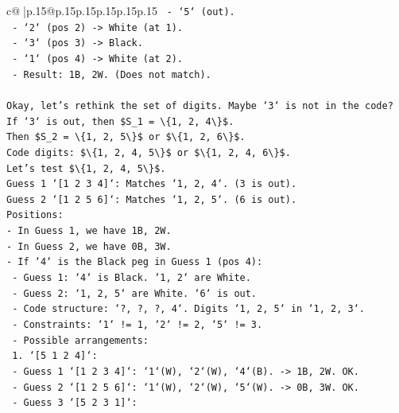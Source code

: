 \documentclass{article}
\begin{document}
{\begin{supertabular}{c@{$\;$}|p{.15\linewidth}@{}p{.15\linewidth}p{.15\linewidth}p{.15\linewidth}p{.15\linewidth}p{.15\linewidth}}
{{{\texttt{       {-} `5` (out).} \\
\texttt{       {-} `2` (pos 2) {-}> White (at 1).} \\
\texttt{       {-} `3` (pos 3) {-}> Black.} \\
\texttt{       {-} `1` (pos 4) {-}> White (at 2).} \\
\texttt{       {-} Result: 1B, 2W. (Does not match).} \\
\\ 
\texttt{Okay, let's rethink the set of digits. Maybe `3` is not in the code?} \\
\texttt{If `3` is out, then \$S\_1 = \textbackslash{}\{1, 2, 4\textbackslash{}\}\$.} \\
\texttt{Then \$S\_2 = \textbackslash{}\{1, 2, 5\textbackslash{}\}\$ or \$\textbackslash{}\{1, 2, 6\textbackslash{}\}\$.} \\
\texttt{Code digits: \$\textbackslash{}\{1, 2, 4, 5\textbackslash{}\}\$ or \$\textbackslash{}\{1, 2, 4, 6\textbackslash{}\}\$.} \\
\texttt{Let's test \$\textbackslash{}\{1, 2, 4, 5\textbackslash{}\}\$.} \\
\texttt{Guess 1 `{[}1 2 3 4{]}`: Matches `1, 2, 4`. (3 is out).} \\
\texttt{Guess 2 `{[}1 2 5 6{]}`: Matches `1, 2, 5`. (6 is out).} \\
\texttt{Positions:} \\
\texttt{{-} In Guess 1, we have 1B, 2W.} \\
\texttt{{-} In Guess 2, we have 0B, 3W.} \\
\texttt{{-} If `4` is the Black peg in Guess 1 (pos 4):} \\
\texttt{  {-} Guess 1: `4` is Black. `1, 2` are White.} \\
\texttt{  {-} Guess 2: `1, 2, 5` are White. `6` is out.} \\
\texttt{  {-} Code structure: `?, ?, ?, 4`. Digits `1, 2, 5` in `1, 2, 3`.} \\
\texttt{  {-} Constraints: `1` != 1, `2` != 2, `5` != 3.} \\
\texttt{  {-} Possible arrangements:} \\
\texttt{    1. `{[}5 1 2 4{]}`:} \\
\texttt{       {-} Guess 1 `{[}1 2 3 4{]}`: `1`(W), `2`(W), `4`(B). {-}> 1B, 2W. OK.} \\
\texttt{       {-} Guess 2 `{[}1 2 5 6{]}`: `1`(W), `2`(W), `5`(W). {-}> 0B, 3W. OK.} \\
\texttt{       {-} Guess 3 `{[}5 2 3 1{]}`:} \\
}}}
\end{supertabular}}
\end{document}
